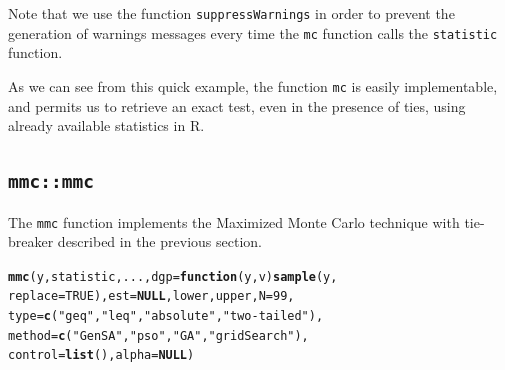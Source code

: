\documentclass[]{article}\usepackage[]{graphicx}\usepackage[]{color}
\makeatletter
\newcommand{\hlnum}[1]{\textcolor[rgb]{0.686,0.059,0.569}{#1}}%
\newcommand{\hlstr}[1]{\textcolor[rgb]{0.192,0.494,0.8}{#1}}%
\newcommand{\hlstd}[1]{\textcolor[rgb]{0.345,0.345,0.345}{#1}}%
\newcommand{\hlkwa}[1]{\textcolor[rgb]{0.161,0.373,0.58}{\textbf{#1}}}%
\newcommand{\hlkwc}[1]{\textcolor[rgb]{0.333,0.667,0.333}{#1}}%
\newcommand{\hlkwd}[1]{\textcolor[rgb]{0.737,0.353,0.396}{\textbf{#1}}}%
\newenvironment{kframe}{%
 \def\at@end@of@kframe{}%
 \ifinner\ifhmode%
  \def\at@end@of@kframe{\end{minipage}}%
  \begin{minipage}{\columnwidth}%
 \fi\fi%
 \def\FrameCommand##1{\hskip\@totalleftmargin \hskip-\fboxsep
 \colorbox{shadecolor}{##1}\hskip-\fboxsep
     \hskip-\linewidth \hskip-\@totalleftmargin \hskip\columnwidth}%
 \MakeFramed {\advance\hsize-\width
   \@totalleftmargin\z@ \linewidth\hsize
   \@setminipage}}%
 {\par\unskip\endMakeFramed%
 \at@end@of@kframe}
\newenvironment{knitrout}{}{} %
\let\proglang=\textsf
\let\code=\texttt
\makeatother
\begin{document}
	Note that we use the function \code{suppressWarnings} in order to prevent the generation of warnings messages every time the \code{mc} function calls the \code{statistic} function.

	As we can see from this quick example, the function \code{mc} is easily implementable, and permits us to retrieve an exact test, even in the presence of ties, using already available statistics in \proglang{R}.

\subsection{\code{mmc::mmc}}

The \code{mmc} function implements the Maximized Monte Carlo technique with tie-breaker described in the previous section.
\begin{knitrout}
\color{fgcolor}\begin{kframe}
\begin{alltt}
\hlkwd{mmc}\hlstd{(y, statistic, ...,} \hlkwc{dgp} \hlstd{=} \hlkwa{function}\hlstd{(}\hlkwc{y}\hlstd{,} \hlkwc{v}\hlstd{)} \hlkwd{sample}\hlstd{(y,}
    \hlkwc{replace} \hlstd{=} \hlnum{TRUE}\hlstd{),} \hlkwc{est} \hlstd{=} \hlkwa{NULL}\hlstd{, lower, upper,} \hlkwc{N} \hlstd{=} \hlnum{99}\hlstd{,}
    \hlkwc{type} \hlstd{=} \hlkwd{c}\hlstd{(}\hlstr{"geq"}\hlstd{,} \hlstr{"leq"}\hlstd{,} \hlstr{"absolute"}\hlstd{,} \hlstr{"two-tailed"}\hlstd{),}
    \hlkwc{method} \hlstd{=} \hlkwd{c}\hlstd{(}\hlstr{"GenSA"}\hlstd{,} \hlstr{"pso"}\hlstd{,} \hlstr{"GA"}\hlstd{,} \hlstr{"gridSearch"}\hlstd{),}
    \hlkwc{control} \hlstd{=} \hlkwd{list}\hlstd{(),} \hlkwc{alpha} \hlstd{=} \hlkwa{NULL}\hlstd{)}
\end{alltt}
\end{kframe}
\end{knitrout}
\end{document}
